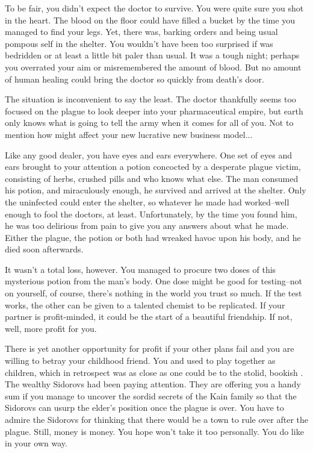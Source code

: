 \documentclass[char]{Pestilence}
\begin{document}
To be fair, you didn't expect the doctor to survive. You were quite sure you shot \cOutsider{\them} in the heart. The blood on the floor could have filled a bucket by the time you managed to find your legs. Yet, there \cOutsider{\they} was, barking orders and being \cOutsider{\their} usual pompous self in the shelter. You wouldn't have been too surprised if \cOutsider{\they} was bedridden or at least a little bit paler than usual. It was a tough night; perhaps you overrated your aim or misremembered the amount of blood. But no amount of human healing could bring the doctor so quickly from death's door.

The situation is inconvenient to say the least. The doctor thankfully seems too focused on the plague to look deeper into your pharmaceutical empire, but earth only knows what \cOutsider{\they} is going to tell the army when it comes for all of you. Not to mention how \cOutsider{\they} might affect your new lucrative new business model...

Like any good dealer, you have eyes and ears everywhere. One set of eyes and ears brought to your attention a potion concocted by a desperate plague victim, consisting of herbs, crushed pills and who knows what else. The man consumed his potion, and miraculously enough, he survived and arrived at the shelter. Only the uninfected could enter the shelter, so whatever he made had worked--well enough to fool the doctors, at least. Unfortunately, by the time you found him, he was too delirious from pain to give you any answers about what he made. Either the plague, the potion or both had wreaked havoc upon his body, and he died soon afterwards. 

It wasn't a total loss, however. You managed to procure two doses of this mysterious potion from the man's body. One dose might be good for testing--not on yourself, of course, there's nothing in the world you trust so much. If the test works, the other can be given to a talented chemist to be replicated. If your partner is profit-minded, it could be the start of a beautiful friendship. If not, well, more profit for you.

There is yet another opportunity for profit if your other plans fail and you are willing to betray your childhood friend. You and \cApprentice{\intro} used to play together as children, which in retrospect was as close as one could be to the stolid, bookish \cApprentice{}. The wealthy Sidorovs had been paying attention. They are offering you a handy sum if you manage to uncover the sordid secrets of the Kain family so that the Sidorovs can usurp the elder's position once the plague is over. You have to admire the Sidorovs for thinking that there would be a town to rule over after the plague. Still, money is money. You hope \cApprentice{} won't take it too personally. You do like \cApprentice{\them} in your own way.
\end{document}
